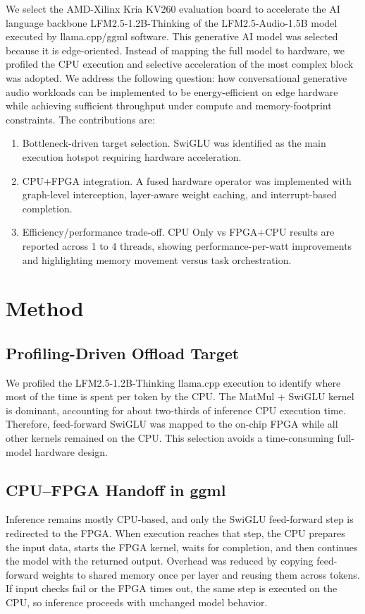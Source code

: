 \documentclass[runningheads]{llncs}
\begin{document}
We select the AMD-Xilinx Kria KV260 evaluation board to accelerate the AI
language backbone LFM2.5-1.2B-Thinking of the LFM2.5-Audio-1.5B model executed
by llama.cpp/ggml software.
This generative AI model was selected because it is edge-oriented.
Instead of mapping the full model to hardware, we profiled the CPU execution and
selective acceleration of the most complex block was adopted.
We address the following question: how conversational generative audio
workloads can be implemented to be energy-efficient on edge hardware while
achieving sufficient throughput under compute and memory-footprint
constraints.
The contributions are:
\begin{enumerate}
    \item Bottleneck-driven target selection. SwiGLU was identified as the main execution hotspot requiring hardware acceleration.
    \item CPU+FPGA integration. A fused hardware operator was implemented with graph-level interception, layer-aware weight caching, and interrupt-based completion.
    \item Efficiency/performance trade-off. CPU Only vs FPGA+CPU results are reported across 1 to 4 threads, showing performance-per-watt improvements and highlighting memory movement versus task orchestration.
\end{enumerate}

\section{Method}\label{sec:method}
\subsection{Profiling-Driven Offload Target}
We profiled the LFM2.5-1.2B-Thinking llama.cpp execution to identify where
most of the time is spent per token by the CPU. The MatMul + SwiGLU kernel
is dominant, accounting for about two-thirds of inference CPU execution time.
Therefore, feed-forward SwiGLU was mapped to the on-chip FPGA while all other
kernels remained on the CPU. This selection avoids a time-consuming full-model hardware design.

\subsection{CPU--FPGA Handoff in ggml}
Inference remains mostly CPU-based, and only the SwiGLU feed-forward step is
redirected to the FPGA. When execution reaches that step, the CPU prepares the
input data, starts the FPGA kernel, waits for completion, and then continues
the model with the returned output. Overhead was reduced by copying
feed-forward weights to shared memory once per layer and reusing them across
tokens. If input checks fail or the FPGA times out, the same step is
executed on the CPU, so inference proceeds with unchanged model behavior.
\end{document}
